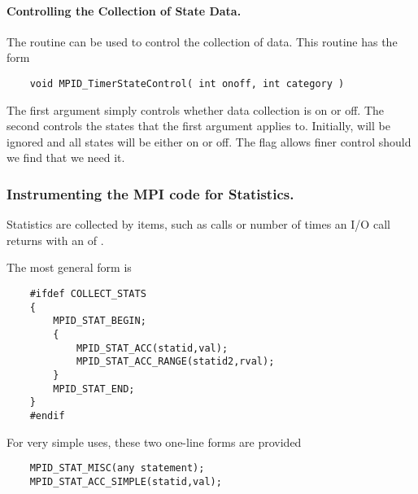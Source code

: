 \documentclass{article}
\begin{document}
\paragraph{Controlling the Collection of State Data.}
The routine  can be used to control the
collection of data.  This routine has the form
\begin{verbatim}
    void MPID_TimerStateControl( int onoff, int category )
\end{verbatim}
The first argument simply controls whether data collection is on or
off.  The second controls the states that the first argument applies
to.  Initially,  will be ignored and all states will be
either on or off.  The  flag allows finer control
should we find that we need it.

\subsubsection{Instrumenting the MPI code for Statistics.}
Statistics are collected by items, such as  calls or
number of times an I/O call returns with an  of
.  

The most general form is
\begin{verbatim}
    #ifdef COLLECT_STATS
    {
        MPID_STAT_BEGIN;
        {
            MPID_STAT_ACC(statid,val);
            MPID_STAT_ACC_RANGE(statid2,rval);
        }
        MPID_STAT_END;
    }
    #endif
\end{verbatim}

For very simple uses, these two one-line forms are provided
\begin{verbatim}
    MPID_STAT_MISC(any statement);
    MPID_STAT_ACC_SIMPLE(statid,val);
\end{verbatim}
\end{document}
